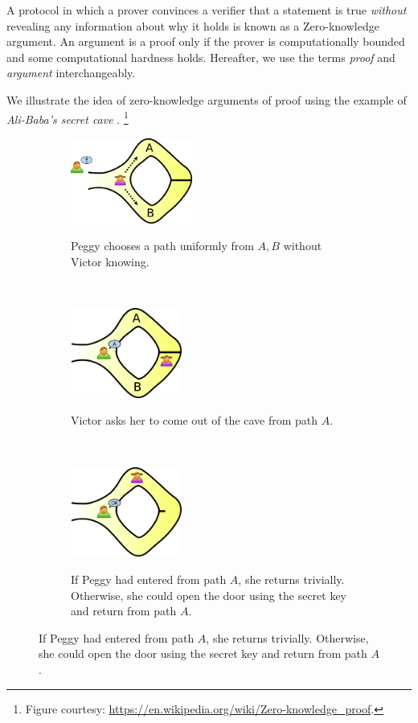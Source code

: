 A protocol in which a prover convinces a verifier that a statement
is true \textit{without} revealing any information about why it holds is known as a Zero-knowledge argument. An argument is a proof only if the prover is computationally bounded and some computational hardness holds. Hereafter, we use the terms \textit{proof} and \textit{argument} interchangeably. 

We illustrate the idea of zero-knowledge arguments of proof using the example of \textit{Ali-Baba's secret cave} \cite{jean89}. \footnote{Figure courtesy: \url{https://en.wikipedia.org/wiki/Zero-knowledge_proof}.}

\begin{figure}[h!]
    \centering
    \begin{subfigure}[b]{0.8\textwidth}
    \centering
        \includegraphics[width=0.44\textwidth]{Figures/Zkip_alibaba1.png}
        \label{fig:zkp1}
        \caption{Peggy chooses a path uniformly from $A, B$ without Victor knowing.}
    \end{subfigure}
    \\
    \begin{subfigure}[b]{0.8\textwidth}
    \centering
        \includegraphics[width=0.4\textwidth]{Figures/Zkip_alibaba2.png}
        \label{fig:zkp2}
        \caption{Victor asks her to come out of the cave from path $A$.}
    \end{subfigure}
    \\
    \begin{subfigure}[b]{0.8\textwidth}
    \centering
        \includegraphics[width=0.4\textwidth]{Figures/Zkip_alibaba3.png}
        \label{fig:zkp3}
        \caption{If Peggy had entered from path $A$, she returns trivially. Otherwise, she could open the door using the secret key and return from path $A$.}
    \end{subfigure}
    

\end{figure}
